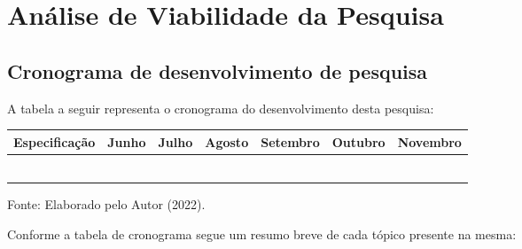 \chapter{Análise de Viabilidade da Pesquisa}

\section{Cronograma de desenvolvimento de pesquisa}

A tabela a seguir representa o cronograma do desenvolvimento desta pesquisa:

\begin{table}[h!]
    \newcommand{\fillCell}{\cellcolor[HTML]{CBCEFB}}
    \begin{tabular}{|p{2cm}|l|l|l|l|l|l|}
    \hline
    \rowcolor[HTML]{CBCEFB} 
    Especificação & Junho  & Julho & Agosto & Setembro & Outubro & Novembro 
    \\ \hline
     & \fillCell & & & & & 
    \\ \hline
     & & \fillCell & & & &
    \\ \hline
     & & & \fillCell & \fillCell & &              \\ \hline
     & & & & & \fillCell & 
    \\ \hline
     & & & & & \fillCell &                     \\ \hline
     & & & & & & \fillCell 
    \\ \hline
    \end{tabular}
    \center Fonte: Elaborado pelo Autor (2022).
\end{table}

Conforme a tabela de cronograma segue um resumo breve de cada tópico presente na mesma: